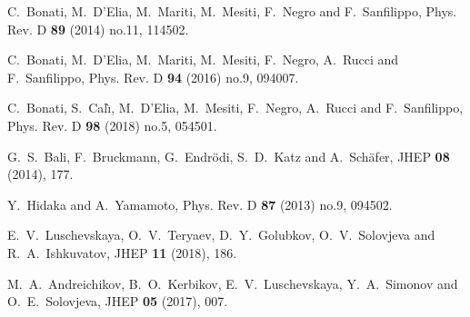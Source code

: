 \begin{thebibliography}{1000}
C.~Bonati, M.~D'Elia, M.~Mariti, M.~Mesiti, F.~Negro and F.~Sanfilippo,
Phys. Rev. D \textbf{89} (2014) no.11, 114502.

C.~Bonati, M.~D'Elia, M.~Mariti, M.~Mesiti, F.~Negro, A.~Rucci and F.~Sanfilippo,
Phys. Rev. D \textbf{94} (2016) no.9, 094007.

C.~Bonati, S.~Cal\`\i{}, M.~D'Elia, M.~Mesiti, F.~Negro, A.~Rucci and F.~Sanfilippo,
Phys. Rev. D \textbf{98} (2018) no.5, 054501.

G.~S.~Bali, F.~Bruckmann, G.~Endr\"odi, S.~D.~Katz and A.~Sch\"afer,
JHEP \textbf{08} (2014), 177.


Y.~Hidaka and A.~Yamamoto,
Phys. Rev. D \textbf{87} (2013) no.9, 094502.

E.~V.~Luschevskaya, O.~V.~Teryaev, D.~Y.~Golubkov, O.~V.~Solovjeva and R.~A.~Ishkuvatov,
JHEP \textbf{11} (2018), 186.

M.~A.~Andreichikov, B.~O.~Kerbikov, E.~V.~Luschevskaya, Y.~A.~Simonov and O.~E.~Solovjeva,
JHEP \textbf{05} (2017), 007.


\end{thebibliography}

